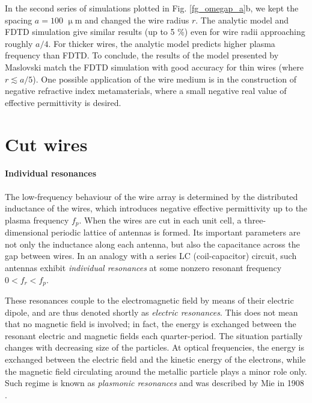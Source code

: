 In the second series of simulations plotted in Fig.  \ref{fg_omegap_a}b, we kept the spacing $a = 100$ $\upmu$m and changed the wire radius $r$. The analytic model and FDTD simulation give similar results (up to 5 \%) even for wire radii approaching roughly $a/4$. For thicker wires, the analytic model predicts higher plasma frequency than FDTD.  To conclude, the results of the model presented by Maslovski match the FDTD simulation with good accuracy for thin wires (where $r \lesssim a/5$). One possible application of the wire medium is in the construction of negative refractive index metamaterials, where a small negative real value of effective permittivity is desired.%



\FloatBarrier %
\section{Cut wires} \label{section_cutwires}
\paragraph{Individual resonances}%
The low-frequency behaviour of the wire array is determined by the distributed inductance of the wires, which introduces negative effective permittivity up to the plasma frequency $f_p$. When the wires are cut in each unit cell, a three-dimensional periodic lattice of antennas is formed. Its important parameters are not only the inductance along each antenna, but also the capacitance across the gap between wires. In an analogy with a series LC (coil-capacitor) circuit, such antennas exhibit \textit{individual resonances} at some nonzero resonant frequency $0<f_r<f_p$. 

These resonances couple to the electromagnetic field by means of their electric dipole, and are thus denoted shortly as \textit{electric resonances}. This does not mean that no magnetic field is involved; in fact, the energy is exchanged between the resonant electric and magnetic fields each quarter-period. The situation partially changes with decreasing size of the particles. At optical frequencies, the energy is exchanged between the electric field and the kinetic energy of the electrons, while the magnetic field circulating around the metallic particle plays a minor role only. Such regime is known as \textit{plasmonic resonances} and was described by Mie in 1908 \cite{mie1908beitrage}.

